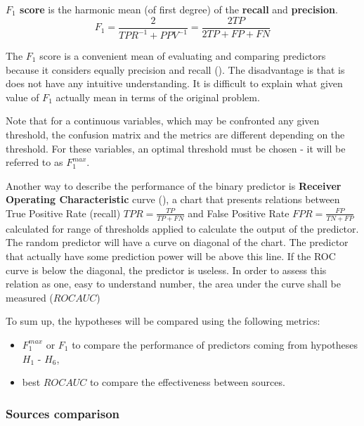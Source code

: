 \documentclass{article}
\begin{document}
\par \textbf{$F_1$ score} is the harmonic mean (of first degree) of the \textbf{recall} and \textbf{precision}.
\[F_1=\frac{2}{TPR^{-1}+PPV^{-1}}=\frac{2TP}{2TP+FP+FN}\]
\par The $F_1$ score is a convenient mean of evaluating and comparing predictors because it considers equally precision and recall (\cite{czakon-f1}).
The disadvantage is that is does not have any intuitive understanding.
It is difficult to explain what given value of $F_1$ actually mean in terms of the original problem.
\par Note that for a continuous variables, which may be confronted any given threshold, the confusion matrix and the metrics are different depending on the threshold.
For these variables, an optimal threshold must be chosen - it will be referred to as $F_1^{max}$.
\vspace{0.5cm}
\par Another way to describe the performance of the binary predictor is \textbf{Receiver Operating Characteristic} curve (\cite{wiki-roc}),
a chart that presents relations between True Positive Rate (recall) \(TPR=\frac{TP}{TP+FN}\)
and False Positive Rate \(FPR=\frac{FP}{TN+FP}\) calculated for range of thresholds applied to calculate the output of the predictor.
The random predictor will have a curve on diagonal of the chart.
The predictor that actually have some prediction power will be above this line.
If the ROC curve is below the diagonal, the predictor is useless.
In order to assess this relation as one, easy to understand number, the area under the curve shall be measured ($ROC AUC$)
\vspace{0.5cm}
\par To sum up, the hypotheses will be compared using the following metrics:
\begin{itemize}
    \item $F_1^{max}$ or $F_1$ to compare the performance of predictors coming from hypotheses $H_1$ - $H_6$,
    \item best $ROC AUC$ to compare the effectiveness between sources.
\end{itemize}

\subsubsection{Sources comparison}
\end{document}
